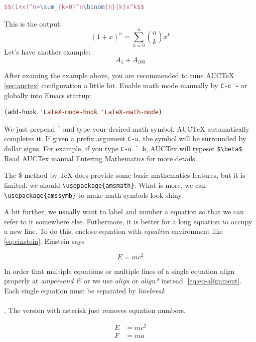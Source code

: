 \begin{lstlisting}[language=TeX,caption={Equation in new line},label={lst:equation-in-new-line}]
$$(1+x)^n=\sum_{k=0}^n\binom{n}{k}x^k$$
\end{lstlisting}

This is the output:
$$(1+x)^n=\sum_{k=0}^n\binom{n}{k}x^k$$
Let's have another example:
$$A_1+A_{100}$$

After examing the example above, you are recommended to tune
AUCTeX \ref{sec:auctex} configuration a little bit. Enable math
mode manually by \verb|C-c ~| or globally into Emacs startup:

\begin{lstlisting}[language=Lisp,caption={\LaTeX{} Math Mode},label={lst:latex-math-mode}]
(add-hook 'LaTeX-mode-hook 'LaTeX-math-mode)
\end{lstlisting}

We just prepend \verb|`| and type your desired math symbol. AUCTeX
automatically completes it. If given a prefix argument \verb|C-u|,
the symbol will be surrounded by dollar signs. For example, if you
type \verb|C-u ` b|, AUCTex will typeset \verb|$\beta$|. Read
AUCTex manual
\href{https://www.gnu.org/software/auctex/manual/auctex/Mathematics.html}{Entering
  Mathematics} for more details.

The \$ method by \TeX{} does provide some basic mathematics
features, but it is limited. we should
\verb|\usepackage{amsmath}|. What is more, we can
\verb|\usepackage{amssymb}| to make math symbols look shiny.

A bit further, we usually want to label and number a equation so
that we can refer to it somewhere else. Futhermore, it is better
for a long equation to occupy a new line. To do this, enclose
equation with \textit{equation} environment like
\eqref{eq:einstein}. Einstein says

\begin{equation}
  \label{eq:einstein}
  E = mc^2
\end{equation}

In order that multiple equations or multiple lines of a single
equation align properly at \textit{ampersand \&} or we use
\textit{align} or \textit{align*} instead.
\eqref{eq:eq-alignment}. Each single equation must be separated by
\textit{linebreak \\\\}. The version with asterisk just removes
equation numbers.

\begin{align}
  \label{eq:multi-eqs}
  E &= mc^2 \\
  F &= ma
\end{align}

